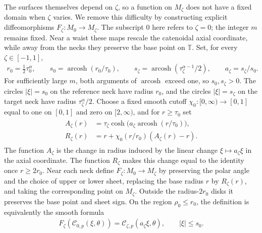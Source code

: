 \documentclass[a4paper,11pt,oneside,reqno]{amsart}
\numberwithin{equation}{section}
\theoremstyle{definition}
\begin{document}
The surfaces themselves depend on $\zeta$, so a function on
$M_\zeta$ does not have a fixed domain when $\zeta$ varies.
We remove this difficulty by constructing explicit
diffeomorphisms $F_\zeta:M_0\to M_\zeta$.
The subscript $0$ here refers to $\zeta=0$; the integer $m$
remains fixed. Near a waist these maps rescale the catenoidal
axial coordinate, while away from the necks they preserve the
base point on $\mathbb T$.
Set, for every $\zeta\in[-1,1]$,
%
\begin{align*}
    r_0=\tfrac12\tau_0^\alpha,\qquad
    s_0=\operatorname{arcosh}(r_0/\tau_0),\qquad
    s_\zeta=\operatorname{arcosh}(\tau_\zeta^{\alpha-1}/2),
    \qquad a_\zeta=s_\zeta/s_0.
\end{align*}
%
For sufficiently large $m$, both arguments of
$\operatorname{arcosh}$ exceed one, so $s_0,s_\zeta>0$.
The circles $|\xi|=s_0$ on the reference neck have radius
$r_0$, and the circles $|\xi|=s_\zeta$ on the target neck
have radius $\tau_\zeta^\alpha/2$.
Choose a fixed smooth cutoff $\chi_0:[0,\infty)\to[0,1]$
equal to one on $[0,1]$ and zero on $[2,\infty)$, and for
$r\geq\tau_0$ set
%
\begin{align}
    \label{eq:s4-radius-identification}
    \begin{split}
        A_\zeta(r)&=\tau_\zeta
        \cosh\bigl(a_\zeta\operatorname{arcosh}(r/\tau_0)\bigr),\\
        R_\zeta(r)&=r+\chi_0(r/r_0)(A_\zeta(r)-r).
    \end{split}
\end{align}
%
The function $A_\zeta$ is the change in radius induced by
the linear change $\xi\mapsto a_\zeta\xi$ in the axial
coordinate. The function $R_\zeta$ makes this change equal
to the identity once $r\geq2r_0$.
Near each neck define $F_\zeta:M_0\to M_\zeta$ by preserving
the polar angle and the choice of upper or lower sheet,
replacing the base radius $r$ by $R_\zeta(r)$, and taking the
corresponding point on $M_\zeta$. Outside the radius-$2r_0$
disks it preserves the base point and sheet sign.
On the region $\rho_0\leq r_0$, the definition is equivalently
the smooth formula
%
\begin{align}
    \label{eq:s4-core-identification}
    F_\zeta(\mathcal{C}_{0,p}(\xi,\theta))
    =\mathcal{C}_{\zeta,p}(a_\zeta\xi,\theta),
    \qquad |\xi|\leq s_0.
\end{align}
%
\end{document}

